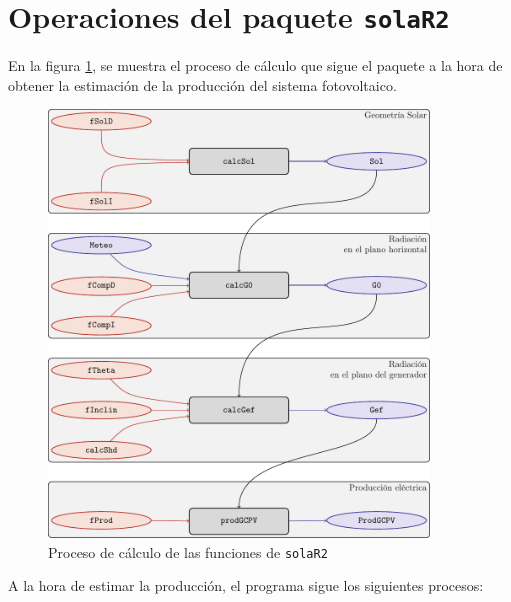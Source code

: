 \section{Operaciones del paquete \texttt{solaR2}}
\label{sec:org4c08f52}
En la figura \ref{fig:orgb4f90b6}, se muestra el proceso de cálculo que sigue el paquete a la hora de obtener la estimación de la producción del sistema fotovoltaico.
\begin{figure}[h]
\centering
\includegraphics[keepaspectratio,width=0.9\textwidth,height=0.5\textheight]{figuras/procedure.pdf}
\caption{\label{fig:orgb4f90b6}Proceso de cálculo de las funciones de \texttt{solaR2}}
\end{figure}
A la hora de estimar la producción, el programa sigue los siguientes procesos:
